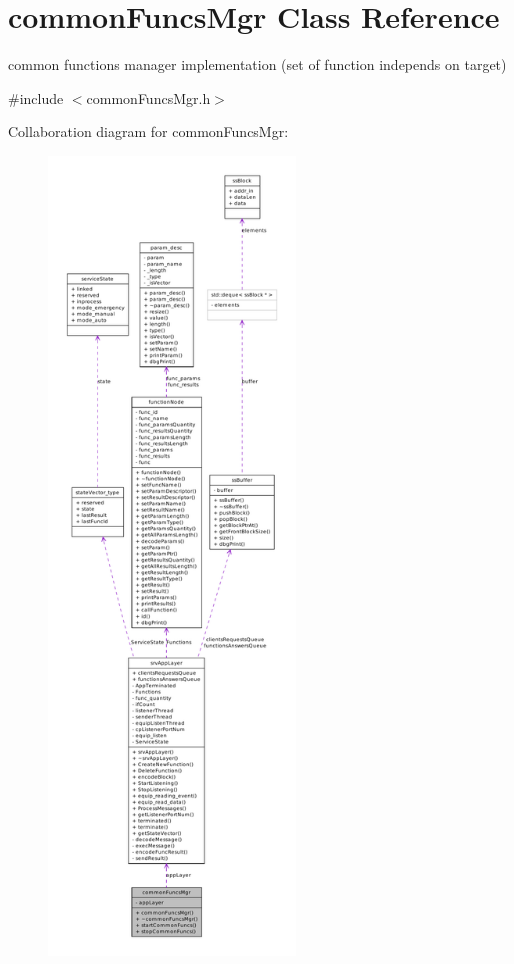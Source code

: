 \hypertarget{classcommonFuncsMgr}{
\section{commonFuncsMgr Class Reference}
\label{d8/d5d/classcommonFuncsMgr}
}


common functions manager implementation (set of function independs on target)  




{\ttfamily \#include $<$commonFuncsMgr.h$>$}



Collaboration diagram for commonFuncsMgr:\nopagebreak
\begin{figure}[H]
\begin{center}
\leavevmode
\includegraphics[height=600pt]{d8/d39/classcommonFuncsMgr__coll__graph}
\end{center}
\end{figure}

